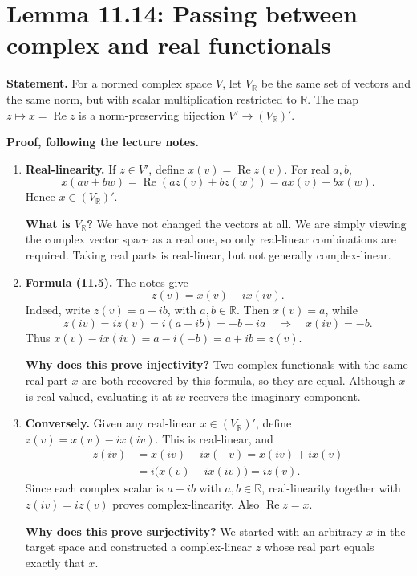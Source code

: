 \documentclass[11pt,a4paper]{article}
\newenvironment{proofsteps}{\begin{enumerate}\setlength{\itemsep}{4pt}}{\end{enumerate}}
\begin{document}
\section{Lemma 11.14: Passing between complex and real functionals}
\textbf{Statement.} For a normed complex space \(V\), let \(V_{\mathbb R}\) be the same set of vectors and the same norm, but with scalar multiplication restricted to \(\mathbb R\).
The map \(z\mapsto x=\operatorname{Re}z\) is a norm-preserving bijection
\(V'\to(V_{\mathbb R})'\).

\textbf{Proof, following the lecture notes.}
\begin{proofsteps}
\item \textbf{Real-linearity.} If \(z\in V'\), define \(x(v)=\operatorname{Re}z(v)\). For real \(a,b\),
\[
 x(av+bw)=\operatorname{Re}(az(v)+bz(w))=ax(v)+bx(w).
\]
Hence \(x\in(V_{\mathbb R})'\).
\begin{personalnote}
\textbf{What is \(V_{\mathbb R}\)?} We have not changed the vectors at all. We are simply viewing the complex vector space as a real one, so only real-linear combinations are required. Taking real parts is real-linear, but not generally complex-linear.
\end{personalnote}

\item \textbf{Formula (11.5).} The notes give
\[
 \boxed{z(v)=x(v)-ix(iv).}\tag{11.5}
\]
Indeed, write \(z(v)=a+ib\), with \(a,b\in\mathbb R\). Then \(x(v)=a\), while
\[
 z(iv)=iz(v)=i(a+ib)=-b+ia\quad\Longrightarrow\quad x(iv)=-b.
\]
Thus \(x(v)-ix(iv)=a-i(-b)=a+ib=z(v)\).
\begin{personalnote}
\textbf{Why does this prove injectivity?} Two complex functionals with the same real part \(x\) are both recovered by this formula, so they are equal. Although \(x\) is real-valued, evaluating it at \(iv\) recovers the imaginary component.
\end{personalnote}

\item \textbf{Conversely.} Given any real-linear \(x\in(V_{\mathbb R})'\), define \(z(v)=x(v)-ix(iv)\). This is real-linear, and
\[
 \begin{aligned}
 z(iv)&=x(iv)-ix(-v)=x(iv)+ix(v)\\
 &=i\bigl(x(v)-ix(iv)\bigr)=iz(v).
 \end{aligned}
\]
Since each complex scalar is \(a+ib\) with \(a,b\in\mathbb R\), real-linearity together with \(z(iv)=iz(v)\) proves complex-linearity. Also \(\operatorname{Re}z=x\).
\begin{personalnote}
\textbf{Why does this prove surjectivity?} We started with an arbitrary \(x\) in the target space and constructed a complex-linear \(z\) whose real part equals exactly that \(x\).
\end{personalnote}


\end{proofsteps}
\end{document}
